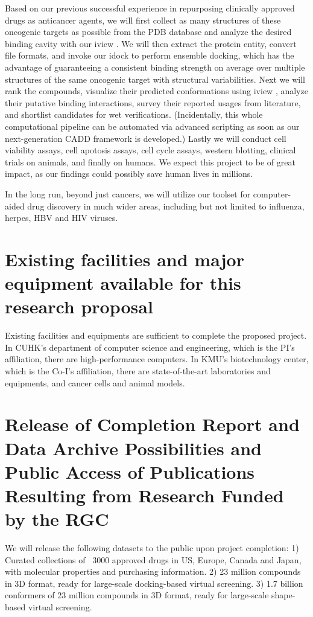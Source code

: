 \documentclass[a4paper,12pt]{article}
\begin{document}
Based on our previous successful experience in repurposing clinically approved drugs as anticancer agents, we will first collect as many structures of these oncogenic targets as possible from the PDB database \citep{537} and analyze the desired binding cavity with our iview \citep{1366}. We will then extract the protein entity, convert file formats, and invoke our idock \citep{1153} to perform ensemble docking, which has the advantage of guaranteeing a consistent binding strength on average over multiple structures of the same oncogenic target with structural variabilities. Next we will rank the compounds, visualize their predicted conformations using iview \citep{1366}, analyze their putative binding interactions, survey their reported usages from literature, and shortlist candidates for wet verifications. (Incidentally, this whole computational pipeline can be automated via advanced scripting as soon as our next-generation CADD framework is developed.) Lastly we will conduct cell viability assays, cell apotosis assays, cell cycle assays, western blotting, clinical trials on animals, and finally on humans. We expect this project to be of great impact, as our findings could possibly save human lives in millions.

In the long run, beyond just cancers, we will utilize our toolset for computer-aided drug discovery in much wider areas, including but not limited to influenza, herpes, HBV and HIV viruses.

\section*{Existing facilities and major equipment available for this research proposal}

Existing facilities and equipments are sufficient to complete the proposed project. In CUHK’s department of computer science and engineering, which is the PI’s affiliation, there are high-performance computers. In KMU’s biotechnology center, which is the Co-I’s affiliation, there are state-of-the-art laboratories and equipments, and cancer cells and animal models.

\section*{Release of Completion Report and Data Archive Possibilities and Public Access of Publications Resulting from Research Funded by the RGC}

We will release the following datasets to the public upon project completion:
1) Curated collections of ~3000 approved drugs in US, Europe, Canada and Japan, with molecular properties and purchasing information.
2) 23 million compounds in 3D format, ready for large-scale docking-based virtual screening.
3) 1.7 billion conformers of 23 million compounds in 3D format, ready for large-scale shape-based virtual screening.
\end{document}
